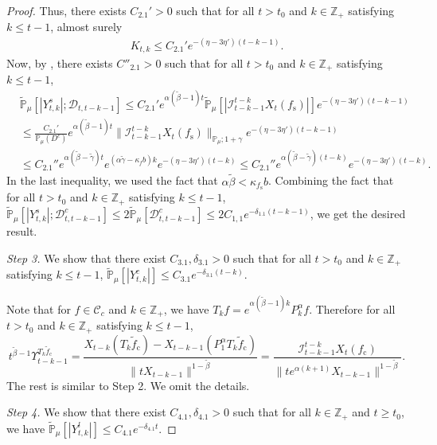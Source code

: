 \documentclass[12pt,a4paper]{amsart}
\theoremstyle{plain}
\theoremstyle{definition}
\numberwithin{equation}{section}
\begin{document}
\begin{proof}
  Thus, there exists $C_{2.1}'> 0$ such that for all $t>t_0$ and $k\in \mathbb Z_+$ satisfying $k\leq t-1$, almost surely
  \begin{align}
    K_{t,k}
    \leq C_{2.1}' e^{-(\eta - 3\eta')(t-k-1)}.
  \end{align}
  Now, by \cite[Lemma 2.13]{RenSongSunZhao2019Stable}, there exists $C''_{2.1}>0$ such that for all $t>t_0$ and $k\in \mathbb Z_+$ satisfying $k\leq t-1$,
  \begin{align}
    & \mathbb{\widetilde{P}}_{\mu} [|Y^s_{t,k}| ; \mathcal{D}_{t,t-k-1} ]
    \leq C_{2.1}' e^{\alpha (\tilde \beta - 1)t} \mathbb{\widetilde{P}}_{\mu} [ | \mathcal{I}_{t-k-1}^{t-k}X_t(f_\mathrm s)| ] e^{-(\eta - 3\eta')(t-k-1)} \\
    & \leq \frac{C_{2.1}' } {\mathbb{P}_{\mu}(D^c)} e^{ \alpha (\tilde \beta - 1)t} \|\mathcal{I}_{t-k-1}^{t-k} X_t(f_\mathrm s)\|_{\mathbb P_\mu; 1+\gamma} e^{-(\eta - 3\eta')(t-k - 1)} \\
    & \leq C_{2.1}'' e^{\alpha(\tilde \beta - \tilde \gamma)t} e^{ (\alpha \tilde \gamma - \kappa_f b)k} e^{-(\eta - 3\eta')(t-k)}
     \leq C_{2.1}'' e^{\alpha(\tilde \beta - \tilde \gamma)(t-k)} e^{-(\eta - 3\eta')(t-k)}.
  \end{align}
  In the last inequality, we used the fact that $\alpha \tilde \beta < \kappa_{f_\mathrm s} b$. Combining the fact that for all $t>t_0$ and $k\in \mathbb Z_+$ satisfying $k\leq t-1$, $\mathbb{\widetilde{P}}_{\mu} [|Y^s_{t,k}| ; \mathcal{D}^c_{t,t-k-1} ]\leq 2\mathbb{\widetilde{P}}_{\mu} [ \mathcal{D}^c_{t,t-k-1} ]\leq 2 C_{1,1}e^{-\delta_{1.1}(t-k-1)}$, we get the desired result.

 \emph{Step 3.} We show that there exist $C_{3.1},\delta_{3.1} > 0$ such that for all $t>t_0$ and $k\in \mathbb Z_+$ satisfying $k\leq t-1$, $ \mathbb{\widetilde{P}}_{\mu}[|Y^c_{t,k}|] \leq  C_{3.1} e^{-\delta_{3.1} (t-k)}.$

  Note that for $f\in \mathcal C_c$ and $k\in \mathbb Z_+$, we have $T_kf = e^{\alpha (\tilde \beta - 1 )k}P_k^\alpha f$. Therefore for all $t>t_0$ and $k\in \mathbb Z_+$ satisfying $k\leq t-1$,
  \[
    t^{\tilde \beta - 1} \Upsilon_{t-k-1}^{T_{k} \tilde f_\mathrm c}
    = \frac{X_{t-k}(T_{k} \tilde f_\mathrm c) - X_{t -k-1}(P_1^\alpha T_{k} \tilde f_\mathrm c)}{\|t X_{t-k-1}\|^{1-\tilde \beta}}
    = \frac{\mathcal I_{t - k - 1}^{t - k} X_t(f_\mathrm c)}{\|te^{\alpha (k+1)}X_{t-k-1} \|^{1 -\tilde \beta}}.
  \]
  The rest is similar to Step 2.
  We omit the details.

 \emph{Step 4.} We show that there exist $C_{4.1}, \delta_{4.1}>0$ such that for all $k \in \mathbb Z_+$ and $t\geq t_0$, we have $\widetilde {\mathbb {P}}_\mu[|Y^l_{t,k}|]\leq C_{4.1}e^{- \delta_{4.1} t}$.


\end{proof}
\end{document}
